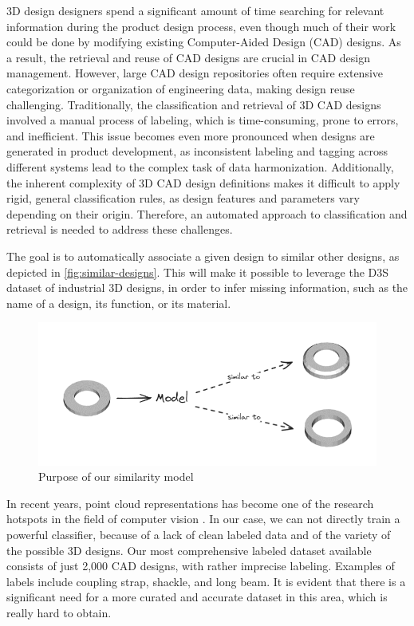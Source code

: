 3D design designers spend a significant amount of time searching for relevant information during the product design process, even though much of their work could be done by modifying existing Computer-Aided Design (CAD) designs. As a result, the retrieval and reuse of CAD designs are crucial in CAD design management. However, large CAD design repositories often require extensive categorization or organization of engineering data, making design reuse challenging. Traditionally, the classification and retrieval of 3D CAD designs involved a manual process of labeling, which is time-consuming, prone to errors, and inefficient. This issue becomes even more pronounced when designs are generated in product development, as inconsistent labeling and tagging across different systems lead to the complex task of data harmonization. Additionally, the inherent complexity of 3D CAD design definitions makes it difficult to apply rigid, general classification rules, as design features and parameters vary depending on their origin. Therefore, an automated approach to classification and retrieval is needed to address these challenges.

The goal is to automatically associate a given design to similar other designs, as depicted in \autoref{fig:similar-designs}. This will make it possible to leverage the D3S dataset of industrial 3D designs, in order to infer missing information, such as the name of a design, its function, or its material.

\begin{figure}[h]
    \centering
    \includegraphics[width=0.8\columnwidth]{images/similar-pieces.png}
    \caption{Purpose of our similarity model}
    \label{fig:similar-designs}
\end{figure}

In recent years, point cloud representations has become one of the research hotspots in the field of computer vision \cite{zhangDeepLearningbased3D2023}.
In our case, we can not directly train a powerful classifier, because of a lack of clean labeled data and of the variety of the possible 3D designs.
Our most comprehensive labeled dataset available consists of just 2,000 CAD designs, with rather imprecise labeling. Examples of labels include coupling strap, shackle, and long beam. It is evident that there is a significant need for a more curated and accurate dataset in this area, which is really hard to obtain.


